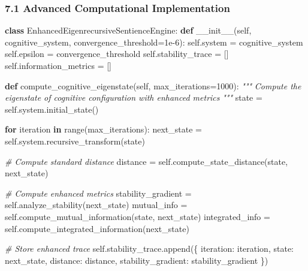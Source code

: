 \documentclass[
]{article}
\newenvironment{Shaded}{}{}
\newcommand{\BuiltInTok}[1]{\textcolor[rgb]{0.00,0.50,0.00}{#1}}
\newcommand{\CommentTok}[1]{\textcolor[rgb]{0.38,0.63,0.69}{\textit{#1}}}
\newcommand{\ControlFlowTok}[1]{\textcolor[rgb]{0.00,0.44,0.13}{\textbf{#1}}}
\newcommand{\DecValTok}[1]{\textcolor[rgb]{0.25,0.63,0.44}{#1}}
\newcommand{\FloatTok}[1]{\textcolor[rgb]{0.25,0.63,0.44}{#1}}
\newcommand{\FunctionTok}[1]{\textcolor[rgb]{0.02,0.16,0.49}{#1}}
\newcommand{\KeywordTok}[1]{\textcolor[rgb]{0.00,0.44,0.13}{\textbf{#1}}}
\newcommand{\NormalTok}[1]{#1}
\newcommand{\OperatorTok}[1]{\textcolor[rgb]{0.40,0.40,0.40}{#1}}
\newcommand{\StringTok}[1]{\textcolor[rgb]{0.25,0.44,0.63}{#1}}
\newcommand{\VariableTok}[1]{\textcolor[rgb]{0.10,0.09,0.49}{#1}}
\begin{document}
\subsubsection{7.1 Advanced Computational
Implementation}\label{advanced-computational-implementation}

\begin{Shaded}
\begin{Highlighting}[]
\KeywordTok{class}\NormalTok{ EnhancedEigenrecursiveSentienceEngine:}
    \KeywordTok{def} \FunctionTok{\_\_init\_\_}\NormalTok{(}\VariableTok{self}\NormalTok{, cognitive\_system, convergence\_threshold}\OperatorTok{=}\FloatTok{1e{-}6}\NormalTok{):}
        \VariableTok{self}\NormalTok{.system }\OperatorTok{=}\NormalTok{ cognitive\_system}
        \VariableTok{self}\NormalTok{.epsilon }\OperatorTok{=}\NormalTok{ convergence\_threshold}
        \VariableTok{self}\NormalTok{.stability\_trace }\OperatorTok{=}\NormalTok{ []}
        \VariableTok{self}\NormalTok{.information\_metrics }\OperatorTok{=}\NormalTok{ []}

    \KeywordTok{def}\NormalTok{ compute\_cognitive\_eigenstate(}\VariableTok{self}\NormalTok{, max\_iterations}\OperatorTok{=}\DecValTok{1000}\NormalTok{):}
        \CommentTok{"""}
\CommentTok{        Compute the eigenstate of cognitive configuration with enhanced metrics}
\CommentTok{        """}
\NormalTok{        state }\OperatorTok{=} \VariableTok{self}\NormalTok{.system.initial\_state()}

        \ControlFlowTok{for}\NormalTok{ iteration }\KeywordTok{in} \BuiltInTok{range}\NormalTok{(max\_iterations):}
\NormalTok{            next\_state }\OperatorTok{=} \VariableTok{self}\NormalTok{.system.recursive\_transform(state)}

            \CommentTok{\# Compute standard distance}
\NormalTok{            distance }\OperatorTok{=} \VariableTok{self}\NormalTok{.compute\_state\_distance(state, next\_state)}

            \CommentTok{\# Compute enhanced metrics}
\NormalTok{            stability\_gradient }\OperatorTok{=} \VariableTok{self}\NormalTok{.analyze\_stability(next\_state)}
\NormalTok{            mutual\_info }\OperatorTok{=} \VariableTok{self}\NormalTok{.compute\_mutual\_information(state, next\_state)}
\NormalTok{            integrated\_info }\OperatorTok{=} \VariableTok{self}\NormalTok{.compute\_integrated\_information(next\_state)}

            \CommentTok{\# Store enhanced trace}
            \VariableTok{self}\NormalTok{.stability\_trace.append(\{}
                \StringTok{\textquotesingle{}iteration\textquotesingle{}}\NormalTok{: iteration,}
                \StringTok{\textquotesingle{}state\textquotesingle{}}\NormalTok{: next\_state,}
                \StringTok{\textquotesingle{}distance\textquotesingle{}}\NormalTok{: distance,}
                \StringTok{\textquotesingle{}stability\_gradient\textquotesingle{}}\NormalTok{: stability\_gradient}
\NormalTok{            \})}


\end{Highlighting}
\end{Shaded}
\end{document}
